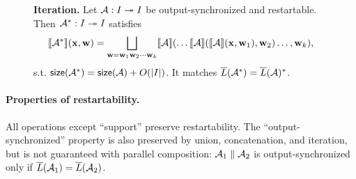 \begin{figure}[H]
\begin{dtbox}
\textbf{Iteration.}
Let $\mathcal{A}: I \twoheadrightarrow I$ be output-synchronized and restartable.
Then ${{\mathcal{A}}^{*}}: I \twoheadrightarrow I$ satisfies
\[
\llbracket {{\mathcal{A}}^{*}} \rrbracket(\mathbf{x},\mathbf{w})
= \bigsqcup_{\mathbf{w} = \mathbf{w}_1 \mathbf{w}_2 \cdots \mathbf{w}_k} \llbracket \mathcal{A} \rrbracket(\ldots \llbracket \mathcal{A} \rrbracket(\llbracket \mathcal{A} \rrbracket(\mathbf{x},\mathbf{w}_1) ,\mathbf{w}_2)\ldots,\mathbf{w}_k),
\]
s.t. $\mathsf{size}({{\mathcal{A}}^{*}}) = \mathsf{size}(\mathcal{A}) + O(|I|)$.
It matches $\overline{L}({{\mathcal{A}}^{*}}) = \overline{L}(\mathcal{A})^{*}$.
\end{dtbox}

\label{dt:fig:iteration}
\end{figure}

\paragraph*{Properties of restartability.}
All operations except ``support'' preserve restartability.
The ``output-synchronized'' property is also preserved by union, concatenation, and iteration, but is not guaranteed with parallel composition: $\mathcal{A}_1 \; \| \; \mathcal{A}_2$ is output-synchronized only if $\overline{L}(\mathcal{A}_1) = \overline{L}(\mathcal{A}_2)$.

